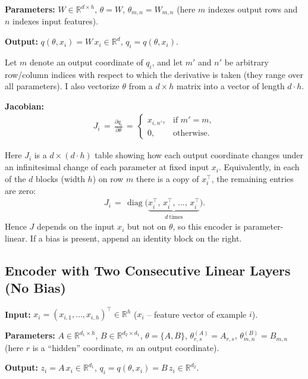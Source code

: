 \textbf{Parameters:} $W\in\mathbb{R}^{d\times h}$, \;$\theta=W$, \;$\theta_{m,n}=W_{m,n}$ \;(here $m$ indexes output rows and $n$ indexes input features).

\textbf{Output:} $q(\theta,x_i)=W\,x_i\in\mathbb{R}^{d}$, \;$q_i=q(\theta,x_i)$.

Let $m$ denote an output coordinate of $q_i$, and let $m'$ and $n'$ be arbitrary row/column indices with respect to which the derivative is taken (they range over all parameters). I also vectorize $\theta$ from a $d\!\times\!h$ matrix into a vector of length $d\!\cdot\!h$.

\textbf{Jacobian:}
\begin{align}
J_i \,=\, \frac{\partial q_i}{\partial \theta} \,=\, \begin{cases}
x_{i,n'}, & \text{if } m' = m,\\
0, & \text{otherwise.}
\end{cases}
\end{align}

Here $J_i$ is a $d \times (d\!\cdot\! h)$ table showing how each output coordinate changes under an infinitesimal change of each parameter at fixed input $x_i$. Equivalently, in each of the $d$ blocks (width $h$) on row $m$ there is a copy of $x_i^{\!\top}$, the remaining entries are zero:
\begin{align}
J_i \,=\, \operatorname{diag}\!\bigl(\underbrace{x_i^{\!\top},\, x_i^{\!\top},\, \dots,\, x_i^{\!\top}}_{d\ \text{times}}\bigr) .
\end{align}
Hence $J$ depends on the input $x_i$ but not on $\theta$, so this encoder is parameter-linear. If a bias is present, append an identity block on the right.

\subsection{Encoder with Two Consecutive Linear Layers (No Bias)}\label{app:two-linear}
\textbf{Input:} $x_i = (x_{i,1},\dots,x_{i,h})^{\!\top} \in \mathbb{R}^{h}$ \;($x_i$ -- feature vector of example $i$).

\textbf{Parameters:} $A\in\mathbb{R}^{d_1\times h}$, $B\in\mathbb{R}^{d_2\times d_1}$, \;$\theta=\{A,B\}$, \;$\theta^{(A)}_{r,s}=A_{r,s}$, \;$\theta^{(B)}_{m,n}=B_{m,n}$ \;(here $r$ is a “hidden” coordinate, $m$ an output coordinate).

\textbf{Output:} $z_i = A\,x_i \in \mathbb{R}^{d_1}$, \; $q_i = q(\theta,x_i) = B\,z_i \in \mathbb{R}^{d_2}$.

